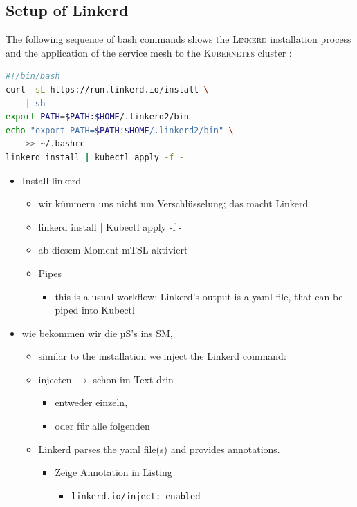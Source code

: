 \subsection{Setup of Linkerd}

The following sequence of bash commands shows the \textsc{Linkerd} installation process and the application of the service mesh to the \textsc{Kubernetes} cluster \cite{linkerd-get-started}:
\begin{lstlisting}[language=bash,caption={Setup of \textsc{Linkerd}}, label={lst:linkerd-setup}]
#!/bin/bash
curl -sL https://run.linkerd.io/install \
	| sh
export PATH=$PATH:$HOME/.linkerd2/bin
echo "export PATH=$PATH:$HOME/.linkerd2/bin" \
	>> ~/.bashrc
linkerd install | kubectl apply -f -
\end{lstlisting}

\begin{itemize}
	\item Install linkerd
\begin{itemize}
	\item wir kümmern uns nicht um Verschlüsselung; das macht Linkerd
	\item linkerd install | Kubectl apply -f -
	\item ab diesem Moment mTSL aktiviert
	\item Pipes
\begin{itemize}
	\item this is a usual workflow: Linkerd’s output is a yaml-file, that can be piped into Kubectl 
\end{itemize}
\end{itemize}
	\item wie bekommen wir die µS's ins SM, 
\begin{itemize}
	\item similar to the installation we inject the Linkerd command:
	\item injecten $\rightarrow$ schon im Text drin
\begin{itemize}
	\item entweder einzeln, 
	\item oder für alle folgenden
\end{itemize}
	\item Linkerd parses the yaml file(s) and provides annotations.
\begin{itemize}
	\item Zeige Annotation in Listing
\begin{itemize}
	\item \lstinline|linkerd.io/inject: enabled|

\end{itemize}
\end{itemize}
\end{itemize}
\end{itemize}
